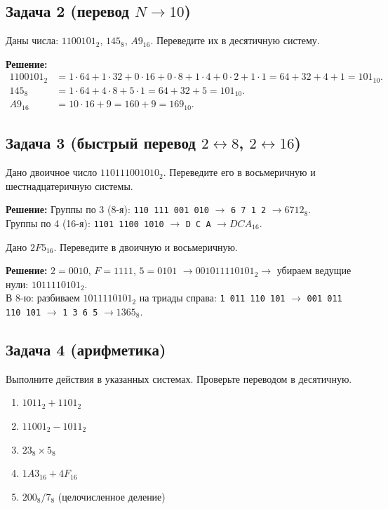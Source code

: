 \subsection*{Задача 2 (перевод $N \to 10$)}
Даны числа: $1100101_2$, $145_8$, $A9_{16}$. Переведите их в десятичную систему.

\textbf{Решение:}
\begin{align*}
1100101_2 &= 1\cdot64 + 1\cdot32 + 0\cdot16 + 0\cdot8 + 1\cdot4 + 0\cdot2 + 1\cdot1 = 64+32+4+1 = 101_{10}.\\
145_8     &= 1\cdot64 + 4\cdot8 + 5\cdot1 = 64+32+5 = 101_{10}.\\
A9_{16}   &= 10\cdot16 + 9 = 160+9 = 169_{10}.
\end{align*}

\subsection*{Задача 3 (быстрый перевод $2\leftrightarrow 8$, $2\leftrightarrow 16$)}
Дано двоичное число $110111001010_2$. Переведите его в восьмеричную и шестнадцатеричную системы.

\textbf{Решение:}
Группы по 3 (8-я): \texttt{110 111 001 010} $\to$ \texttt{6 7 1 2} $\to 6712_8$.\\
Группы по 4 (16-я): \texttt{1101 1100 1010} $\to$ \texttt{D C A} $\to DCA_{16}$.

Дано $2F5_{16}$. Переведите в двоичную и восьмеричную.

\textbf{Решение:}
$2=0010$, $F=1111$, $5=0101$ $\to 001011110101_2 \to$ убираем ведущие нули: $1011110101_2$.\\
В 8-ю: разбиваем $1011110101_2$ на триады справа: \texttt{1 011 110 101} $\to$ \texttt{001 011 110 101} $\to$ \texttt{1 3 6 5} $\to 1365_8$.

\subsection*{Задача 4 (арифметика)}
Выполните действия в указанных системах. Проверьте переводом в десятичную.
\begin{enumerate}
    \item[a)] $1011_2 + 1101_2$
    \item[b)] $11001_2 - 1011_2$
    \item[c)] $23_8 \times 5_8$
    \item[d)] $1A3_{16} + 4F_{16}$
    \item[e)] $200_8 / 7_8$ (целочисленное деление)
\end{enumerate}

